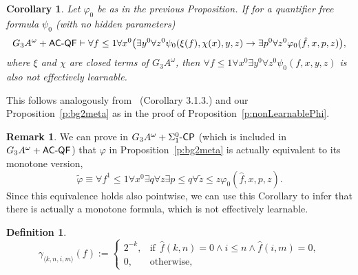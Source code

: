 \documentclass[1p]{elsarticle}
\newcommand{\usftext}[1]{\textsf{\upshape #1}}
\newcommand{\CP}{\ensuremath{\usftext{CP}}}
\newcommand{\QF}{\ensuremath{\usftext{QF}}}
\newcommand{\AC}{\ensuremath{\usftext{AC}}}
\newcommand{\SiLm}{\ensuremath{\Sigma^0_1\usftext{-}}}
\newcommand{\m}{\ensuremath{\usftext{-}}}
\newcommand{\Tif}{\text{if}\ }
\newcommand{\Telse}{\text{otherwise}}
\theoremstyle{plain}
\newtheorem{cor}[thm]{Corollary}
\theoremstyle{definition}
\newtheorem{dfn}[thm]{Definition}
\newtheorem{rmk}[thm]{Remark}
\theoremstyle{remark}
\renewenvironment{proof}[1][]{\noindent{\bf Proof{#1}. }}{\nopagebreak[4]{\hspace*{\fill}
  $\Box$              %
 }{\vspace{2ex}}}
\renewcommand{\phi}{\varphi}
\theoremstyle{definition}
\begin{document}
{\begin{cor}\label{c:anyStrongerPhi}
Let $\phi_0$ be as in the previous Proposition. If for a quantifier free formula $\psi_0$ (with no hidden parameters)
\[
G_3A^\omega+\AC\m\QF\vdash \forall f\leq 1 \forall x^0\big( \exists y^0\forall z^0 \psi_0(\xi(f),\chi(x),y,z)
 \rightarrow \exists p^0\forall z^0 \phi_0(\hat f,x,p,z) \big),
\]
where $\xi$ and $\chi$ are closed terms of $G_3A^\omega$,
then $\forall f\leq 1\forall x^0\exists y^0\forall z^0 \psi_0(f,x,y,z)$ is also not effectively learnable.
\end{cor}
\begin{proof}
This follows analogously from~\cite{Kohlenbach(lowrate)} (Corollary 3.1.3.) and our Proposition~\ref{p:bg2meta} as in the proof
of Proposition~\ref{p:nonLearnablePhi}.
\end{proof}

\begin{rmk}
We can prove in $G_3A^\omega+\SiLm\CP$ (which is included in $G_3A^\omega+\AC\m\QF$) that $\phi$ in Proposition~\ref{p:bg2meta} is actually equivalent to its monotone version, 
\[
\tilde\phi\equiv \forall f^1\leq 1\forall x^0\exists q\forall z \exists p\leq q\forall \tilde z\leq z \phi_0(\hat f,x,p,z).
\]
Since this equivalence holds also pointwise, we can use this Corollary to infer that there is actually a monotone formula, which is not effectively learnable.
\end{rmk}

\begin{dfn}\label{d:gammaf}
\[
\gamma_{\langle k,n,i,m\rangle}(f):=\begin{cases}
2^{-k},&\Tif\ \hat f(k,n)=0\wedge i\leq n\wedge \hat f(i,m)=0,\\
0,&\Telse,\end{cases}
\]
\end{dfn}

}
\end{document}
